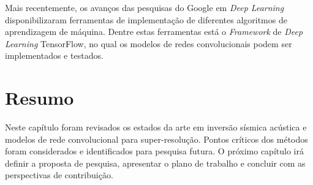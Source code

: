 Mais recentemente, os avanços das pesquisas do Google em \textit{Deep Learning} disponibilizaram
ferramentas de implementação de diferentes algoritmos de aprendizagem de máquina. Dentre estas
ferramentas está o \textit{Framework} de \textit{Deep Learning} TensorFlow, no qual os modelos
de redes convolucionais podem ser implementados e testados.

\section{Resumo}

Neste capítulo foram revisados os estados da arte em inversão sísmica acústica e modelos
de rede convolucional para super-resolução.
Pontos críticos dos métodos foram considerados e
identificados para pesquisa futura. O próximo capítulo irá definir a proposta de
pesquisa, apresentar o plano de trabalho e concluir com as perspectivas de
contribuição.
